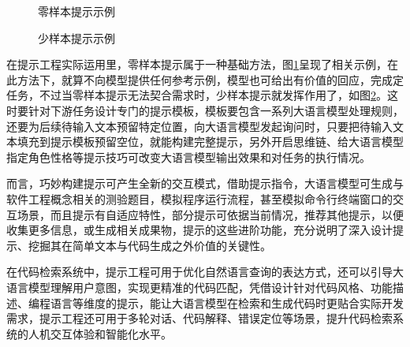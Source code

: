 \documentclass[UTF8,a4paper,12pt]{ctexart}
\numberwithin{equation}{section}
\begin{document}
\begin{figure}[H]
	\caption{零样本提示示例}
	\label{zero_shot}
\end{figure}
\begin{figure}[H]
	\caption{少样本提示示例}
	\label{few_shot}
\end{figure}

在提示工程实际运用里，零样本提示\cite{ref17}属于一种基础方法，图\ref{zero_shot}呈现了相关示例，在此方法下，就算不向模型提供任何参考示例，模型也可给出有价值的回应，完成定任务，不过当零样本提示无法契合需求时，少样本提示\cite{ref18}就发挥作用了，如图\ref{few_shot}。这时要针对下游任务设计专门的提示模板，模板要包含一系列大语言模型处理规则，还要为后续待输入文本预留特定位置，向大语言模型发起询问时，只要把待输入文本填充到提示模板预留空位，就能构建完整提示，另外开启思维链、给大语言模型指定角色性格等提示技巧可改变大语言模型输出效果和对任务的执行情况。\par
而言，巧妙构建提示可产生全新的交互模式，借助提示指令，大语言模型可生成与软件工程概念相关的测验题目，模拟程序运行流程，甚至模拟命令行终端窗口的交互场景，而且提示有自适应特性，部分提示可依据当前情况，推荐其他提示，以便收集更多信息，或生成相关成果物，提示的这些进阶功能，充分说明了深入设计提示、挖掘其在简单文本与代码生成之外价值的关键性。\par
在代码检索系统中，提示工程可用于优化自然语言查询的表达方式，还可以引导大语言模型理解用户意图，实现更精准的代码匹配，凭借设计针对代码风格、功能描述、编程语言等维度的提示，能让大语言模型在检索和生成代码时更贴合实际开发需求，提示工程还可用于多轮对话、代码解释、错误定位等场景，提升代码检索系统的人机交互体验和智能化水平。\par
\end{document}
